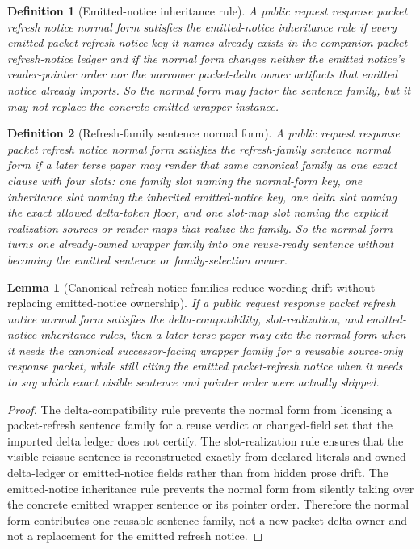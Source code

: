 \documentclass[11pt]{article}
\newtheorem{definition}{Definition}
\newtheorem{lemma}{Lemma}
\begin{document}
\begin{definition}[Emitted-notice inheritance rule]
A public request response packet refresh notice normal form satisfies the \emph{emitted-notice inheritance rule} if every emitted packet-refresh-notice key it names already exists in the companion packet-refresh-notice ledger and if the normal form changes neither the emitted notice's reader-pointer order nor the narrower packet-delta owner artifacts that emitted notice already imports.
So the normal form may factor the sentence family, but it may not replace the concrete emitted wrapper instance.
\end{definition}

\begin{definition}[Refresh-family sentence normal form]
A public request response packet refresh notice normal form satisfies the \emph{refresh-family sentence normal form} if a later terse paper may render that same canonical family as one exact clause with four slots: one family slot naming the normal-form key, one inheritance slot naming the inherited emitted-notice key, one delta slot naming the exact allowed delta-token floor, and one slot-map slot naming the explicit realization sources or render maps that realize the family.
So the normal form turns one already-owned wrapper family into one reuse-ready sentence without becoming the emitted sentence or family-selection owner.
\end{definition}

\begin{lemma}[Canonical refresh-notice families reduce wording drift without replacing emitted-notice ownership]
If a public request response packet refresh notice normal form satisfies the delta-compatibility, slot-realization, and emitted-notice inheritance rules, then a later terse paper may cite the normal form when it needs the canonical successor-facing wrapper family for a reusable source-only response packet, while still citing the emitted packet-refresh notice when it needs to say which exact visible sentence and pointer order were actually shipped.
\end{lemma}

\begin{proof}
The delta-compatibility rule prevents the normal form from licensing a packet-refresh sentence family for a reuse verdict or changed-field set that the imported delta ledger does not certify.
The slot-realization rule ensures that the visible reissue sentence is reconstructed exactly from declared literals and owned delta-ledger or emitted-notice fields rather than from hidden prose drift.
The emitted-notice inheritance rule prevents the normal form from silently taking over the concrete emitted wrapper sentence or its pointer order.
Therefore the normal form contributes one reusable sentence family, not a new packet-delta owner and not a replacement for the emitted refresh notice.\qedhere
\end{proof}
\end{document}
